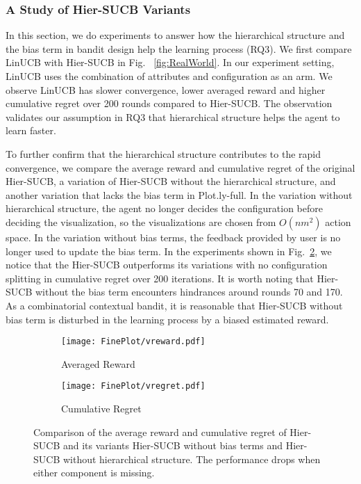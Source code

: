 \subsubsection{A Study of Hier-SUCB Variants}
In this section, we do experiments to answer how the hierarchical structure and the bias term in bandit design help the learning process (RQ3). We first compare LinUCB with Hier-SUCB in Fig. ~\ref{fig:RealWorld}. In our experiment setting, LinUCB uses the combination of attributes and configuration as an arm. We observe LinUCB has slower convergence, lower averaged reward and higher cumulative regret over 200 rounds compared to Hier-SUCB. The observation validates our assumption in RQ3 that hierarchical structure helps the agent to learn faster.

To further confirm that the hierarchical structure contributes to the rapid convergence, we compare the average reward and cumulative regret of the original Hier-SUCB, a variation of Hier-SUCB without the hierarchical structure, and another variation that lacks the bias term in Plot.ly-full. In the variation without hierarchical structure, the agent no longer decides the configuration before deciding the visualization, so the visualizations are chosen from $O(nm^2)$ action space. In the variation without bias terms, the feedback provided by user is no longer used to update the bias term. In the experiments shown in Fig.~\ref{fig:var-regret}, we notice that the Hier-SUCB outperforms its variations with no configuration splitting in cumulative regret over 200 iterations. It is worth noting that Hier-SUCB without the bias term encounters hindrances around rounds 70 and 170. As a combinatorial contextual bandit, it is reasonable that Hier-SUCB without bias term is disturbed in the learning process by a biased estimated reward.

\begin{figure}
	\centering
	\begin{subfigure}{0.48\columnwidth}
		\centering
		\texttt{[image: FinePlot/vreward.pdf]}
		\caption{Averaged Reward}
		\label{fig:var-reward}
	\end{subfigure}
	\begin{subfigure}{0.48\columnwidth}
    	\centering
    	\texttt{[image: FinePlot/vregret.pdf]}
    	\caption{Cumulative Regret}
    	\label{fig:var-regret}
	\end{subfigure}
 \vspace{-1em}
	\caption{Comparison of the average reward and cumulative regret of Hier-SUCB and its variants Hier-SUCB without bias terms and Hier-SUCB without hierarchical structure. The performance drops when either component is missing.} 
	\label{fig:varient}
 \vspace{-1em}
\end{figure}

